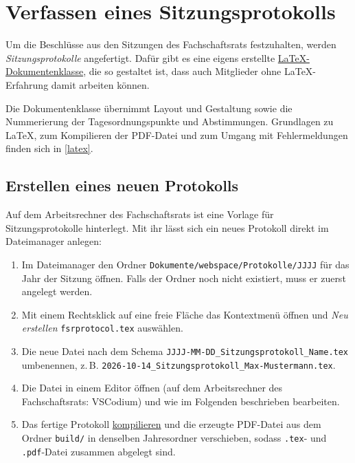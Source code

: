 \section{Verfassen eines Sitzungsprotokolls}
\label{protokoll}
Um die Beschlüsse aus den Sitzungen des Fachschaftsrats festzuhalten, werden \textit{Sitzungsprotokolle} angefertigt. Dafür gibt es eine eigens erstellte \hyperref[latex-uebersicht]{\LaTeX-Dokumentenklasse}, die so gestaltet ist, dass auch Mitglieder ohne \LaTeX-Erfahrung damit arbeiten können.

Die Dokumentenklasse übernimmt Layout und Gestaltung sowie die Nummerierung der Tagesordnungspunkte und Abstimmungen. Grundlagen zu \LaTeX{}, zum Kompilieren der PDF-Datei und zum Umgang mit Fehlermeldungen finden sich in \autoref{latex}.

\subsection{Erstellen eines neuen Protokolls}
\label{protokoll-erstellen}
Auf dem Arbeitsrechner des Fachschaftsrats ist eine Vorlage für Sitzungsprotokolle hinterlegt. Mit ihr lässt sich ein neues Protokoll direkt im Dateimanager anlegen:


\begin{enumerate}
	\item Im Dateimanager den Ordner \texttt{Dokumente/webspace/Protokolle/JJJJ} für das Jahr der Sitzung öffnen. Falls der Ordner noch nicht existiert, muss er zuerst angelegt werden.
	\item Mit einem Rechtsklick auf eine freie Fläche das Kontextmenü öffnen und
	      \textit{Neu erstellen} \textrightarrow{} \texttt{fsrprotocol.tex} auswählen.
	\item Die neue Datei nach dem Schema \texttt{JJJJ-MM-DD\_Sitzungsprotokoll\_Name.tex} umbenennen,
	      z.\,B. \texttt{2026-10-14\_Sitzungsprotokoll\_Max-Mustermann.tex}.
	\item Die Datei in einem Editor öffnen (auf dem Arbeitsrechner des Fachschaftsrats: VSCodium) und wie im Folgenden beschrieben bearbeiten.
	\item Das fertige Protokoll \hyperref[latex-kompilieren]{kompilieren} und die erzeugte PDF-Datei aus dem Ordner \texttt{build/} in denselben Jahresordner verschieben, sodass \texttt{.tex}- und \texttt{.pdf}-Datei zusammen abgelegt sind.
\end{enumerate}


